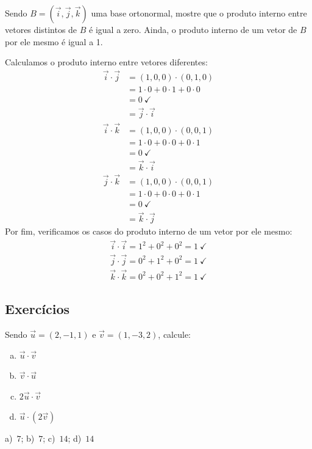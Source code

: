 \begin{exeresol}
  Sendo $B=(\vec{i},\vec{j},\vec{k})$ uma base ortonormal, mostre que o produto interno entre vetores distintos de $B$ é igual a zero. Ainda, o produto interno de um vetor de $B$ por ele mesmo é igual a 1.
\end{exeresol}
\begin{resol}
  Calculamos o produto interno entre vetores diferentes:
  \begin{align}
    \vec{i}\cdot\vec{j} &= (1,0,0)\cdot (0,1,0)\\
                        &= 1\cdot 0 + 0\cdot 1 + 0\cdot 0 \\
                        &= 0~\checkmark\\
                        &= \vec{j}\cdot\vec{i}
  \end{align}
  \begin{align}
    \vec{i}\cdot\vec{k} &= (1,0,0)\cdot (0,0,1)\\
                        &= 1\cdot 0 + 0\cdot 0 + 0\cdot 1 \\
                        &= 0~\checkmark \\
                        &= \vec{k}\cdot\vec{i}
  \end{align}
  \begin{align}
    \vec{j}\cdot\vec{k} &= (1,0,0)\cdot (0,0,1)\\
                        &= 1\cdot 0 + 0\cdot 0 + 0\cdot 1 \\
                        &= 0~\checkmark \\
                        &= \vec{k}\cdot\vec{j}
  \end{align}
  Por fim, verificamos os casos do produto interno de um vetor por ele mesmo:
  \begin{gather}
    \vec{i}\cdot\vec{i} = 1^2+0^2+0^2 = 1~\checkmark\\
    \vec{j}\cdot\vec{j} = 0^2+1^2+0^2 = 1~\checkmark\\
    \vec{k}\cdot\vec{k} = 0^2+0^2+1^2 = 1~\checkmark
  \end{gather}
\end{resol}

\subsection{Exercícios}

\begin{exer}
  Sendo $\vec{u}=(2,-1,1)$ e $\vec{v}=(1,-3,2)$, calcule:
  \begin{enumerate}[a)]
  \item $\vec{u}\cdot\vec{v}$
  \item $\vec{v}\cdot\vec{u}$
  \item $2\vec{u}\cdot\vec{v}$
  \item $\vec{u}\cdot(2\vec{v})$
  \end{enumerate}
\end{exer}
\begin{resp}
  a)~$7$; b)~$7$; c)~$14$; d)~$14$
\end{resp}

